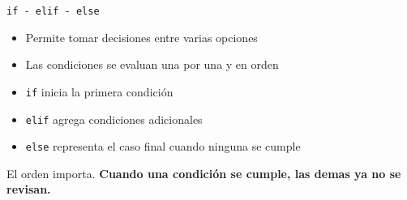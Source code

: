 \documentclass{beamer}
\begin{document}

    \begin{frame}[fragile,t]{\texttt{if - elif - else}}
        \begin{itemize}
            \item Permite tomar decisiones entre varias opciones
            \item Las condiciones se evaluan una por una y en orden
            \item \texttt{if} inicia la primera condición
            \item \texttt{elif} agrega condiciones adicionales
            \item \texttt{else} representa el caso final cuando ninguna se cumple
        \end{itemize}
        El orden importa. \textbf{Cuando una condición se cumple, las demas ya no se revisan.}
    \end{frame}
\end{document}
